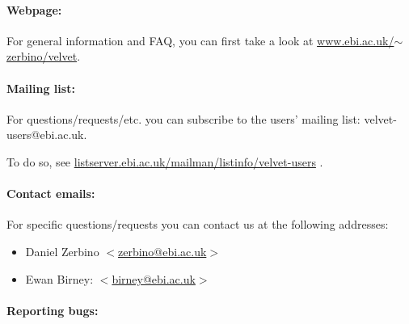 \documentclass{article}
\begin{document}
\paragraph{Webpage:}

For general information and FAQ, you can first take a look at 
\href{http://www.ebi.ac.uk/~zerbino/velvet/}{www.ebi.ac.uk/$\sim$zerbino/velvet}.

\paragraph{Mailing list:}

For questions/requests/etc. you can subscribe to the users' mailing list: velvet-users@ebi.ac.uk.

To do so, see \href{http://listserver.ebi.ac.uk/mailman/listinfo/velvet-users}{listserver.ebi.ac.uk/mailman/listinfo/velvet-users} .


\paragraph{Contact emails:}

For specific questions/requests you can contact us at the following addresses:
\begin{itemize}
\item Daniel Zerbino $<$\href{mailto:zerbino@ebi.ac.uk}{zerbino@ebi.ac.uk}$>$
\item Ewan Birney: $<$\href{mailto:birney@ebi.ac.uk}{birney@ebi.ac.uk}$>$
\end{itemize}

\paragraph{Reporting bugs:}
\end{document}
